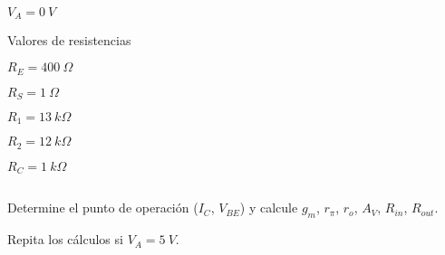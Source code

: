\begin{frame}[t]
\begin{columns}
\begin{column}{0.33\textwidth}
            $V_A=0\ V$

            \vspace{5mm}
            Valores de resistencias

            \vspace{3mm}
            $R_E = 400\ \Omega$

            $R_S = 1\ \Omega$

            $R_1 = 13\ k\Omega$

            $R_2 = 12\ k\Omega$

            $R_C = 1\ k\Omega$
        \end{column}
    \end{columns}
    \flushleft
    Determine el punto de operación ($I_C$, $V_{BE}$) y calcule $g_m$, $r_\pi$, $r_o$, $A_V$, $R_{in}$, $R_{out}$.

    Repita los cálculos si $V_A=5\ V$.
\end{frame}

